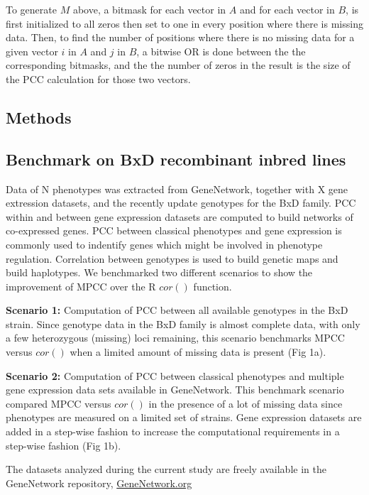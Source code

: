 \documentclass{bioinfo}
\begin{document}
To generate $M$ above, a bitmask for each vector in $A$ and for each vector in $B$, 
is first initialized to all zeros then set to one in every position where there is missing data.
Then, to find the number of positions where there is no missing data for a given vector $i$ 
in $A$ and $j$ in $B$, a bitwise OR is done between the the corresponding bitmasks, and the 
the number of zeros in the result is the size of the PCC calculation for those two vectors. \vspace*{-12pt}

\begin{methods}
\section{Methods}

\subsection{Benchmark on BxD recombinant inbred lines}
Data of N phenotypes was extracted from GeneNetwork, together with 
X gene extression datasets, and the recently update genotypes for 
the BxD family. PCC within and between gene expression datasets are 
computed to build networks of co-expressed genes. PCC between 
classical phenotypes and gene expression is commonly used to 
indentify genes which might be involved in phenotype regulation. 
Correlation between genotypes is used to build genetic maps and 
build haplotypes. We benchmarked two different scenarios to show 
the improvement of MPCC over the R $cor()$ function.

{\bf Scenario 1:} Computation of PCC between all available genotypes 
in the BxD strain. Since genotype data in the BxD family is almost 
complete data, with only a few heterozygous (missing) loci remaining, 
this scenario benchmarks MPCC versus $cor()$ when a limited amount of 
missing data is present (Fig 1a).

{\bf Scenario 2:} Computation of PCC between classical phenotypes and 
multiple gene expression data sets available in GeneNetwork. This 
benchmark scenario compared MPCC versus $cor()$ in the presence of 
a lot of missing data since phenotypes are measured on a limited set 
of strains. Gene expression datasets are added in a step-wise fashion 
to increase the computational requirements in a step-wise fashion 
(Fig 1b).

The datasets analyzed during the current study are freely available in the 
GeneNetwork repository, \href{https://genenetwork.org/}{GeneNetwork.org}

\end{methods} \vspace*{-6pt}
\end{document}
